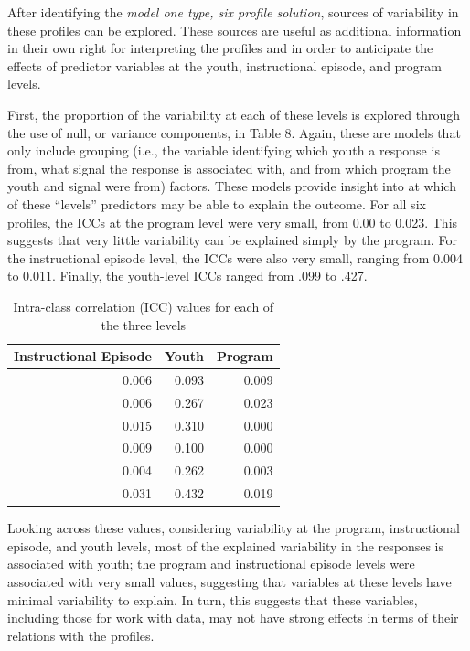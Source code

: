 \documentclass[]{book}
\theoremstyle{definition}
\theoremstyle{definition}
\theoremstyle{definition}
\theoremstyle{remark}
\begin{document}
After identifying the \emph{model one type, six profile solution},
sources of variability in these profiles can be explored. These sources
are useful as additional information in their own right for interpreting
the profiles and in order to anticipate the effects of predictor
variables at the youth, instructional episode, and program levels.

First, the proportion of the variability at each of these levels is
explored through the use of null, or variance components, in Table 8.
Again, these are models that only include grouping (i.e., the variable
identifying which youth a response is from, what signal the response is
associated with, and from which program the youth and signal were from)
factors. These models provide insight into at which of these ``levels''
predictors may be able to explain the outcome. For all six profiles, the
ICCs at the program level were very small, from 0.00 to 0.023. This
suggests that very little variability can be explained simply by the
program. For the instructional episode level, the ICCs were also very
small, ranging from 0.004 to 0.011. Finally, the youth-level ICCs ranged
from .099 to .427.

\begin{landscape}\begin{table}

\caption{\label{tab:unnamed-chunk-11}Intra-class correlation (ICC) values for each of the three levels}
\centering
\begin{tabular}[t]{rrr}
\toprule
Instructional Episode & Youth & Program\\
\midrule
0.006 & 0.093 & 0.009\\
0.006 & 0.267 & 0.023\\
0.015 & 0.310 & 0.000\\
0.009 & 0.100 & 0.000\\
0.004 & 0.262 & 0.003\\
0.031 & 0.432 & 0.019\\
\bottomrule
\end{tabular}
\end{table}
\end{landscape}

Looking across these values, considering variability at the program,
instructional episode, and youth levels, most of the explained
variability in the responses is associated with youth; the program and
instructional episode levels were associated with very small values,
suggesting that variables at these levels have minimal variability to
explain. In turn, this suggests that these variables, including those
for work with data, may not have strong effects in terms of their
relations with the profiles.
\end{document}
